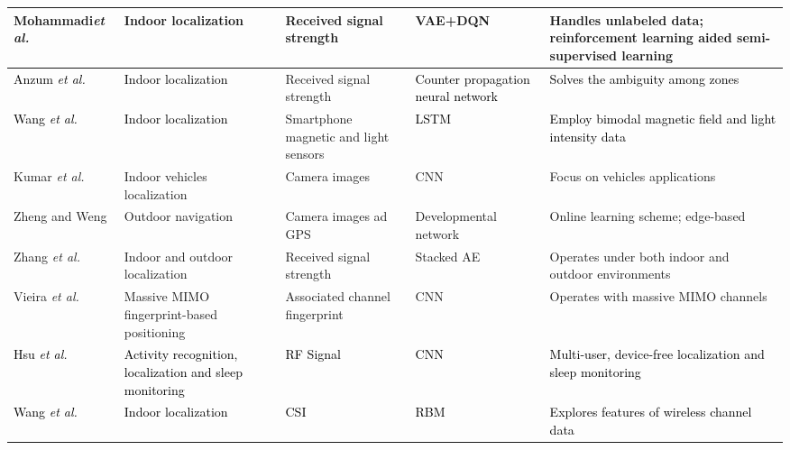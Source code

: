 \documentclass[journal,comsoc,letter]{IEEEtran}
\newcommand{\edit}[1]{\textcolor{black}{#1}}
\newcommand{\rev}[1]{\textcolor{black}{#1}}
\begin{document}
\begin{table*}[h!]
\begin{tabular}{|C{2cm}|C{3.5cm}|>{\color{black}}C{2cm}|C{3cm}|C{5cm}|}
Mohammadi\emph{et al.} \cite{mohammadi2017semi}           & Indoor localization                        & Received signal strength              & VAE+DQN                                   & Handles unlabeled data; reinforcement learning aided semi-supervised learning \\ \hline
\edit{Anzum \emph{et al.} \cite{anzum2018zone}}           & \edit{Indoor localization}                 & Received signal strength              & \edit{Counter propagation neural network} & \edit{Solves the ambiguity among zones}                                       \\ \hline
\edit{Wang \emph{et al.} \cite{wang2018deepml}}           & \edit{Indoor localization}                 & Smartphone magnetic and light sensors & \edit{LSTM}                               & \edit{Employ bimodal magnetic field and light intensity data}                 \\ \hline
Kumar \emph{et al.} \cite{kumar2016indoor}                & Indoor vehicles localization               & Camera images                         & CNN                                       & Focus on vehicles applications                                                \\ \hline
Zheng and Weng \cite{zhengj2016mobile}                    & Outdoor navigation                         & Camera images ad GPS                  & Developmental network                     & Online learning scheme; edge-based                                            \\ \hline
Zhang \emph{et al.} \cite{zhang2016deep3}                 & Indoor and outdoor localization            & Received signal strength              & Stacked AE                                & Operates under both indoor and outdoor environments                           \\ \hline
Vieira \emph{et al.} \cite{vieira2017deep}                & Massive MIMO fingerprint-based positioning & Associated channel fingerprint         & CNN                                       & Operates with massive MIMO channels                                           \\ \hline
\rev{Hsu \emph{et al.} \cite{Hsu:2017:ZIS:3139486.3130924}}                & \rev{Activity recognition, localization and sleep monitoring} & \rev{RF Signal}         & \rev{CNN}      & \rev{Multi-user, device-free localization and sleep monitoring }                                          \\ \hline
\rev{Wang \emph{et al.} \cite{wang2017csi}}                & \rev{Indoor localization} & \rev{CSI}         & \rev{RBM}      & \rev{Explores features of wireless channel data
}
\end{tabular}
\end{table*}
\end{document}

